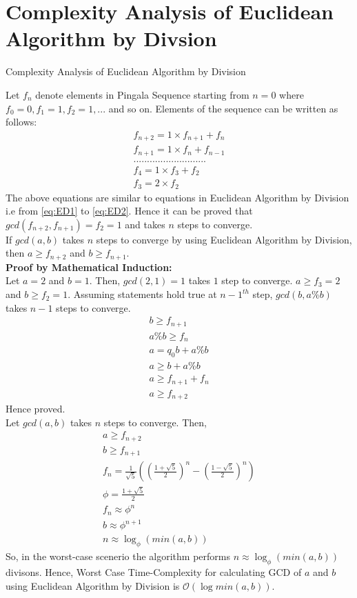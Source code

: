 \documentclass[8pt]{beamer}
\begin{document}
\section{Complexity Analysis of Euclidean Algorithm by Divsion}
\begin{frame}[allowframebreaks]{Complexity Analysis of Euclidean Algorithm by Division}

Let $f_{n}$ denote elements in Pingala Sequence starting from $n=0$ where $f_{0} = 0, f_{1} = 1, f_{2} = 1,...$ and so on. Elements of the sequence can be written as follows:
\begin{align*}
f_{n+2} = 1 \times f_{n+1} + f_{n}\\
f_{n+1} = 1 \times f_{n} + f_{n-1}\\
...........................\\
f_{4} = 1 \times f_{3} + f_{2}\\
f_{3} = 2 \times f_{2}
\end{align*}
The above equations are similar to equations in Euclidean Algorithm by Division i.e from \eqref{eq:ED1} to \eqref{eq:ED2}. Hence it can be proved that $gcd(f_{n+2}, f_{n+1}) = f_{2} = 1$ and takes $n$ steps to converge.\\

If $gcd(a,b)$ takes $n$ steps to converge by using Euclidean Algorithm by Division, then $a \geq f_{n+2}$ and $b \geq f_{n+1}$.\\

\textbf{Proof by Mathematical Induction:}\\
Let $a = 2$ and $b = 1$. Then, $gcd(2,1) = 1$ takes $1$ step to converge. $a \geq f_{3} = 2$ and $b \geq f_{2} = 1$. Assuming statements hold true at ${n-1}^{th}$ step, $gcd(b,a\%b)$ takes $n-1$ steps to converge.
\begin{align}
b \geq f_{n+1}\\
a\%b \geq f_{n}\\
a = q_{0}b + a\%b\\
a \geq b + a\%b\\
a \geq f_{n+1} + f_{n}\\
a \geq f_{n+2}
\end{align}
Hence proved.\\

Let $gcd(a,b)$ takes $n$ steps to converge. Then,
\begin{align}
a \geq f_{n+2}\\
b \geq f_{n+1}\\
f_{n}=\frac{1}{\sqrt{5}}\left(\left(\frac{1+\sqrt{5}}{2}\right)^{n}-\left(\frac{1-\sqrt{5}}{2}\right)^{n}\right)\\
\phi = \frac{1+\sqrt{5}}{2}\\
f_{n} \approx \phi^{n}\\
b \approx \phi^{n+1}\\
n \approx \log_{\phi}{\left(min(a,b)\right)}
\end{align}
So, in the worst-case scenerio the algorithm performs $n \approx \log_{\phi}{\left(min(a,b)\right)} $ divisons. Hence, Worst Case Time-Complexity for calculating GCD of $a$ and  $b$ using Euclidean Algorithm by Division is $\mathcal{O}(\log min(a,b))$.\\


\end{frame}
\end{document}
